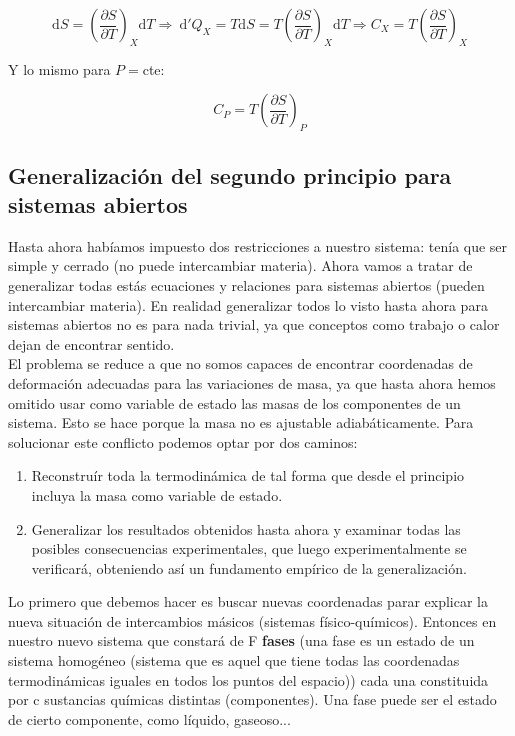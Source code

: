 \documentclass[12pt,a4paper]{article}
\newcommand{\D}{\mathrm{d}}
\newcommand{\parentesis}[1]{\left( #1 \right)}
\newcommand{\parciales}[2]{\frac{\partial #1}{\partial #2}}
\begin{document}
$$ \D S  =  \parentesis{\parciales{S}{T}}_X \D T \Longrightarrow \ \D' Q_X = T \D S =  T \parentesis{\parciales{S}{T}}_X \D T \Longrightarrow  C_X = T \parentesis{\parciales{S}{T}}_X $$

Y lo mismo para $P =$cte:

$$ C_P = T \parentesis{\parciales{S}{T}}_P $$

\subsection{Generalización del segundo principio para sistemas abiertos}

Hasta ahora habíamos impuesto dos restricciones a nuestro sistema: tenía que ser simple y cerrado (no puede intercambiar materia). Ahora vamos a tratar de generalizar todas estás ecuaciones y relaciones para sistemas abiertos (pueden intercambiar materia). En realidad generalizar todos lo visto hasta ahora para sistemas abiertos no es para nada trivial, ya que conceptos como trabajo o calor dejan de encontrar sentido. \\

El problema se reduce a que no somos capaces de encontrar coordenadas de deformación adecuadas para las variaciones de masa, ya que hasta ahora hemos omitido usar como variable de estado las masas de los componentes de un sistema. Esto se hace porque la masa no es ajustable adiabáticamente. Para solucionar este conflicto podemos optar por dos caminos: 

\begin{enumerate}
\item Reconstruír toda la termodinámica de tal forma que desde el principio incluya la masa como variable de estado.

\item Generalizar los resultados obtenidos hasta ahora y examinar todas las posibles consecuencias experimentales, que luego experimentalmente se verificará, obteniendo así un fundamento empírico de la generalización. 
\end{enumerate}


Lo primero que debemos hacer es buscar nuevas coordenadas parar explicar la nueva situación de intercambios másicos (sistemas físico-químicos). Entonces en nuestro nuevo sistema que constará de F \textbf{fases} (una fase es un estado de un sistema homogéneo (sistema que es aquel que tiene todas las coordenadas termodinámicas iguales en todos los puntos del espacio)) cada una constituida por c sustancias químicas distintas (componentes). Una fase puede ser el estado de cierto componente, como líquido, gaseoso... \\
\end{document}
